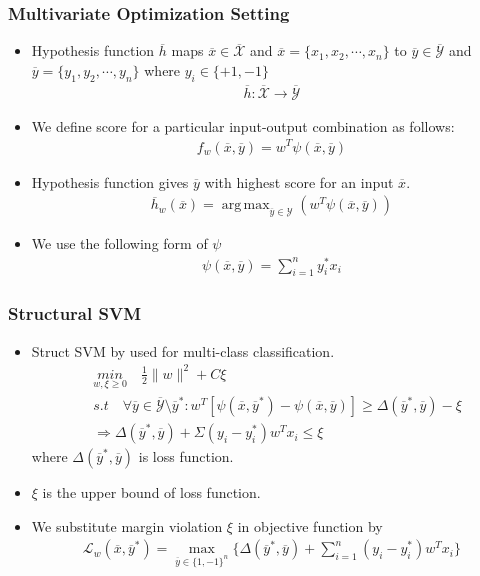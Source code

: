 \documentclass{beamer}
\DeclareMathOperator*{\argmax}{arg\,max}
\begin{document}
\begin{frame}
	\frametitle{Multivariate Optimization Setting}
	\begin{itemize}
	\item Hypothesis function $\overline{h}$ maps $\overline{x}\in \mathcal{\overline{X}}$ and $\overline{x}=\{x_1,x_2,\cdots,x_n\}$ to $\overline{y}\in\mathcal{\overline{Y}}$ and $\overline{y}=\{y_1,y_2,\cdots,y_n\}$ where $y_i\in \{+1,-1\}$
	\begin{align*}
		\overline{h}:\overline{\mathcal{X}} \rightarrow \overline{\mathcal{Y}}
	\end{align*}
	\item We define score for a particular input-output combination as follows:
	\begin{align*}
		f_w(\overline{x},\overline{y}) = w^T\psi({\overline{x},\overline{y}})
	\end{align*}
	\item Hypothesis function gives $\overline{y}$ with highest score for an input $\overline{x}$.
	\begin{align*}
		\overline{h}_w(\overline{x})=\argmax_{\overline{y}\in\mathcal{Y}}(w^T\psi({\overline{x},\overline{y}}))
	\end{align*}
	\item We use the following form of $\psi$	
	\begin{align*}
		\psi(\overline{x},\overline{y}) = \sum_{i=1}^n y_i^*x_i
	\end{align*}
	\end{itemize}
\end{frame}


\begin{frame}
	\frametitle{Structural SVM}
	\begin{itemize}
	\item Struct SVM by \cite{p1} used for multi-class classification.
	\begin{equation*}
	\begin{split}
	& \underset{w,\xi \geq 0}{min} \quad \frac{1}{2}\|w\|^2+C\xi\\
	& s.t \quad \forall\overline{y} \in \overline{\mathcal{Y}}\setminus\overline{y}^*:w^T[\psi(\overline{x},\overline{y}^*)- \psi(\overline{x},\overline{y})]\geq \Delta(\overline{y}^*,\overline{y})-\xi\\
	& \Rightarrow \Delta(\overline{y}^*,\overline{y}) + \Sigma (y_i - y_i^*)w^Tx_i \leq \xi
	\end{split}
	\end{equation*}
	where $\Delta(\overline{y}^*,\overline{y})$ is loss function.	
	\item $\xi$ is the upper bound of loss function.
	\item We substitute margin violation $\xi$ in objective function by
	\begin{align}
	\label{eqn:1}
	\mathcal L_w(\overline{x},\overline{y}^*)=\max_{\overline{y}\in\{1,-1\}^n}\{\Delta(\overline{y}^*,\overline{y}) + \sum_{i=1}^n (y_i - y_i^*)w^Tx_i\}
	\end{align}
	\end{itemize}
\end{frame}
\end{document}
